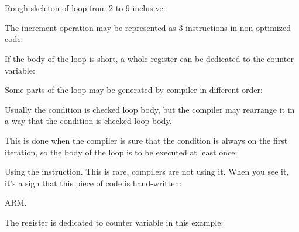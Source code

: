 ﻿\section{\Conclusion{}}

Rough skeleton of loop from 2 to 9 inclusive:



The increment operation may be represented as 3 instructions in non-optimized code:



If the body of the loop is short, a whole register can be dedicated to the counter variable:



Some parts of the loop may be generated by compiler in different order:



Usually the condition is checked  loop body, but the compiler may rearrange it in a way that
the condition is checked  loop body.

This is done when the compiler is sure that the condition is always  on the first iteration, 
so the body of the loop is to be executed at least once:




Using the  instruction. This is rare, compilers are not using it.
When you see it, it's a sign that this piece of code is hand-written:



ARM. 

The  register is dedicated to counter variable in this example:




